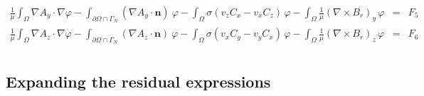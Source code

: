 \documentclass[smallextended]{svjour3}       %
\begin{document}
\begin{eqnarray}
			\frac{1}{\mu}\int_{\Omega}\nabla A_y \cdot \nabla \varphi - \int_{\partial \Omega \cap \Gamma_{N}} \left(\nabla A_y\cdot \mathbf{n}\right)\ \varphi 
			 - \int_{\Omega} \sigma \left(v_z C_x - v_x C_z\right)\,\varphi -\int_{\Omega}\frac{1}{\mu} \left(\nabla \times B_r \right)_y\,\varphi & = & F_5\nonumber \\
			\frac{1}{\mu}\int_{\Omega}\nabla A_z \cdot \nabla \varphi - \int_{\partial \Omega \cap \Gamma_{N}} \left(\nabla A_z\cdot \mathbf{n}\right)\ \varphi 
			 - \int_{\Omega} \sigma \left(v_x C_y - v_y C_x\right)\,\varphi -\int_{\Omega}\frac{1}{\mu} \left(\nabla \times B_r \right)_z\,\varphi & = & F_6\nonumber \\
			 \nonumber 
		\end{eqnarray}
		
		\subsection{Expanding the residual expressions}
\end{document}
